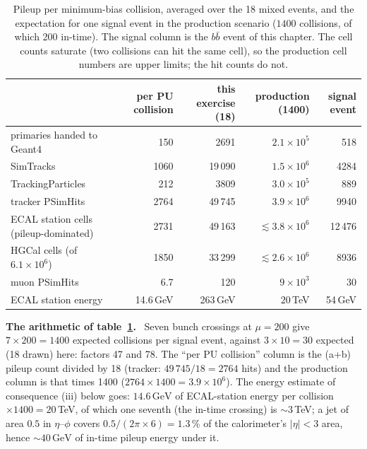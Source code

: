 \documentclass[11pt,a4paper]{article}
\newcommand{\bbbar}{\ensuremath{b\bar{b}}}
\newcommand{\GeV}{\,\mathrm{GeV}}
\newenvironment{plainwords}[1][In plain words]{%
  \par\medskip\noindent\setlength{\fboxsep}{6pt}\setlength{\fboxrule}{0.6pt}%
  \begin{lrbox}{\plainbox}\begin{minipage}{\dimexpr\textwidth-2\fboxsep-2\fboxrule\relax}\small
  \textbf{\textcolor{plainrule}{#1.}}\ \ignorespaces}{%
  \end{minipage}\end{lrbox}\noindent\fcolorbox{plainrule}{plainbg}{\usebox{\plainbox}}\par\medskip}
\begin{document}
\begin{table}[H]
\centering\small
\caption{Pileup per minimum-bias collision, averaged over the 18 mixed events, and the expectation for one
signal event in the production scenario ($1400$ collisions, of which 200 in-time). The signal column is the
\bbbar{} event of this chapter. The cell counts saturate (two collisions can hit the same cell), so the
production cell numbers are upper limits; the hit counts do not.}
\label{tab:scaling}
\footnotesize
\begin{tabular}{lrrrr}
\toprule
 & per PU collision & this exercise (18) & production (1400) & signal event \\
\midrule
primaries handed to Geant4 & 150 & 2691 & $2.1\times10^5$ & 518 \\
SimTracks & 1060 & 19\,090 & $1.5\times10^6$ & 4284 \\
TrackingParticles & 212 & 3809 & $3.0\times10^5$ & 889 \\
tracker PSimHits & 2764 & 49\,745 & $3.9\times10^6$ & 9940 \\
ECAL station cells (pileup-dominated) & 2731 & 49\,163 & $\lesssim 3.8\times10^6$ & 12\,476 \\
HGCal cells (of $6.1\times10^6$) & 1850 & 33\,299 & $\lesssim 2.6\times10^6$ & 8936 \\
muon PSimHits & 6.7 & 120 & $9\times10^3$ & 30 \\
ECAL station energy & 14.6\,GeV & 263\,GeV & $20$\,TeV & 54\,GeV \\
\bottomrule
\end{tabular}
\end{table}

\begin{plainwords}[The arithmetic of table~\ref{tab:scaling}]
Seven bunch crossings at $\mu=200$ give $7\times200 = 1400$ expected collisions per signal event, against
$3\times10 = 30$ expected (18 drawn) here: factors 47 and 78. The ``per PU collision'' column is the (a+b)
pileup count divided by 18 (tracker: $49\,745/18 = 2764$ hits) and the production column is that times 1400
($2764\times1400 = 3.9\times10^{6}$). The energy estimate of consequence (iii) below goes: $14.6\GeV$ of
ECAL-station energy per collision $\times1400 = 20$\,TeV, of which one seventh (the in-time crossing) is
$\sim3$\,TeV; a jet of area $0.5$ in $\eta$--$\phi$ covers $0.5/(2\pi\times6) = 1.3$\,\% of the
calorimeter's $|\eta|<3$ area, hence $\sim40\GeV$ of in-time pileup energy under it.
\end{plainwords}
\end{document}
